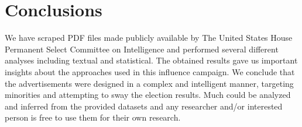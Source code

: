 \documentclass[11pt]{article}
\begin{document}

\section*{\centering Conclusions}

We have scraped PDF files made publicly available by The United States House
Permanent Select Committee on Intelligence and performed several different
analyses including textual and statistical. The obtained results gave us
important insights about the approaches used in this influence campaign.
We conclude that the advertisements were designed in a complex and intelligent
manner, targeting minorities and attempting to sway the election results. Much
could be analyzed and inferred from the provided datasets and any researcher
and/or interested person is free to use them for their own research.


\newpage

\begin{center}
\printbibliography[heading=bibintoc]
\end{center}

\end{document}
